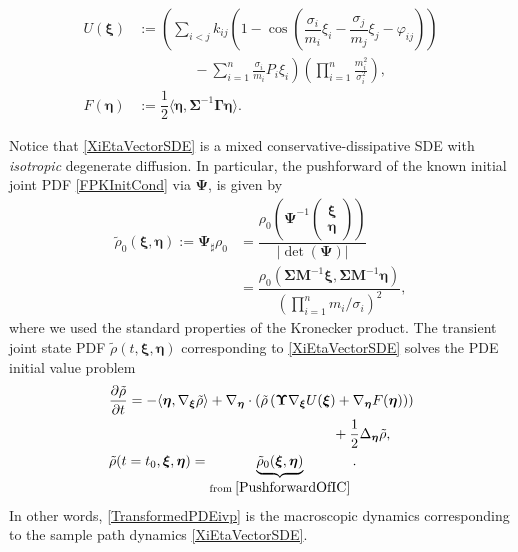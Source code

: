 \documentclass[10pt,twocolumn]{IEEEtran}
\begin{document}
{\small{\begin{subequations}
\begin{align}
U(\bm{\xi}) &:= \left(\displaystyle\sum_{i<j}k_{ij}\left(\!1 \!- \!\cos\!\left(\!\dfrac{\sigma_{i}}{m_{i}}\xi_{i} - \dfrac{\sigma_{j}}{m_{j}}\xi_{j} - \varphi_{ij}\!\!\right)\!\right) \right.\nonumber\\
&\left.\qquad\qquad-\displaystyle\sum_{i=1}^{n}\!\frac{\sigma_{i}}{m_{i}}P_{i}\xi_{i}\right)\left(\prod_{i=1}^{n}\frac{m_{i}^{2}}{\sigma_{i}^{2}}\right), \label{defU}
\\
F(\bm{\eta}) &:= \dfrac{1}{2}\langle\bm{\eta},\bm{\Sigma}^{-1}\bm{\Gamma}\bm{\eta}\rangle. \label{defF}	
\end{align}
\label{NewPotentials}	
\end{subequations}}}


Notice that \eqref{XiEtaVectorSDE} is a mixed conservative-dissipative SDE with \emph{isotropic} degenerate diffusion. In particular, the pushforward of the known initial joint PDF \eqref{FPKInitCond} via $\bm{\Psi}$, is given by
\begin{align}
\tilde{\rho}_{0}(\bm{\xi},\bm{\eta}) := \bm{\Psi}_{\sharp} \rho_{0} 
&= \dfrac{\rho_{0}\left(\bm{\Psi}^{-1} \begin{pmatrix}
\bm{\xi}\\
\bm{\eta}	
\end{pmatrix}\right)}{|\det\left(\bm{\Psi}\right)|} \nonumber\\
&= \dfrac{\rho_{0}\left(\bm{\Sigma}\bm{M}^{-1}\bm{\xi},\bm{\Sigma}\bm{M}^{-1}\bm{\eta}\right)}{\left(\displaystyle\prod_{i=1}^{n}m_{i}/\sigma_{i}\right)^{\!2}},
\label{PushforwardOfIC}	
\end{align}
where we used the standard properties of the Kronecker product. The transient joint state PDF $\tilde{\rho}(t,\bm{\xi},\bm{\eta})$ corresponding to \eqref{XiEtaVectorSDE} solves the PDE initial value problem
\begin{subequations}
\begin{align}
&\dfrac{\partial\tilde{\rho}}{\partial t} = -\langle\bm{\eta},\nabla_{\bm{\xi}}\tilde{\rho}\rangle + \nabla_{\bm{\eta}}\cdot\left(\tilde{\rho}\left(\bm{\Upsilon}\nabla_{\bm{
\xi}}U(\bm{\xi})+\nabla_{\bm{\eta}}F(\bm{\eta})\right)\right) \nonumber\\
&\qquad\qquad\qquad\qquad\qquad\qquad\qquad\qquad+ \dfrac{1}{2}\Delta_{\bm{\eta}}\tilde{\rho}, \label{NewPDE}\\
&\tilde{\rho}(t=t_{0},\bm{\xi},\bm{\eta}) = \underbrace{\tilde{\rho}_{0}(\bm{\xi},\bm{\eta})}_{\text{from}\;\eqref{PushforwardOfIC}}. \label{NewIC}	
\end{align}
\label{TransformedPDEivp}	
\end{subequations}
In other words, \eqref{TransformedPDEivp} is the macroscopic dynamics corresponding to the sample path dynamics \eqref{XiEtaVectorSDE}.
\end{document}
